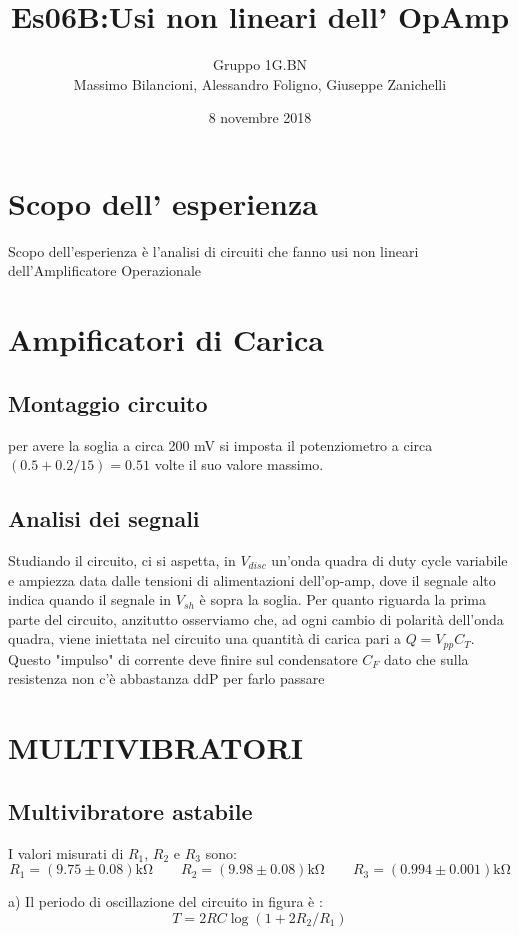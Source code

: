 \documentclass[10pt,a4paper]{article}
\author{Gruppo 1G.BN \\ Massimo Bilancioni, Alessandro Foligno, Giuseppe Zanichelli }
\title{Es06B:Usi non lineari dell’ OpAmp }
\begin{document}
	\date{8 novembre 2018}
	\maketitle
	
	
	\section*{Scopo dell' esperienza}
	Scopo dell'esperienza è l'analisi di circuiti che fanno usi non lineari dell'Amplificatore Operazionale




\section{Ampificatori di Carica}
	\subsection{Montaggio circuito}
		per avere la soglia a circa 200 \si{\milli \volt} si imposta il potenziometro a circa $(0.5+0.2/15)=0.51$ volte il suo valore massimo.
	\subsection{Analisi dei segnali}
		Studiando il circuito, ci si aspetta, in $V_{disc}$ un'onda quadra di duty cycle variabile e ampiezza data dalle tensioni di alimentazioni dell'op-amp, dove il segnale alto indica quando il segnale in $V_{sh}$ è sopra la soglia.
		Per quanto riguarda la prima parte del circuito, anzitutto osserviamo che, ad ogni cambio di polarità dell'onda quadra, viene iniettata nel circuito una quantità di carica pari a $Q=V_{pp} C_T$. Questo "impulso" di corrente deve finire sul condensatore $C_F$ dato che sulla resistenza non c'è abbastanza ddP per farlo passare
\section{ MULTIVIBRATORI }


\subsection{Multivibratore astabile}
I valori misurati di $R_1$, $R_2$ e $R_3$ sono:
\[ R_1 = (9.75\pm 0.08)\si{\kilo\ohm} \qquad  R_2 = (9.98 \pm 0.08)\si{\kilo\ohm} \qquad   R_3 = ( 0.994 \pm0.001 ) \si{\kilo\ohm}\]

a)  Il periodo di oscillazione del circuito in figura è : \[ T = 2 RC \log( 1+ 2 R_2/R_1)\]
\end{document}
